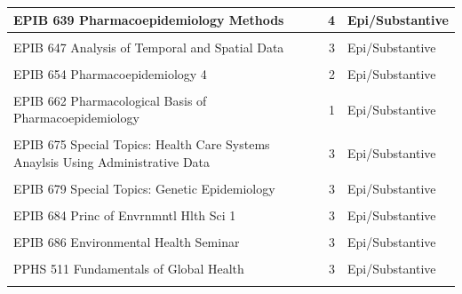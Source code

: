 \documentclass[
]{book}
\begin{document}
\begin{table}
{\begin{tabular}[t]{l|r|l}
\hline
EPIB 639 Pharmacoepidemiology Methods & 4 & Epi/Substantive\\
\hline
\cellcolor{gray!6}{EPIB 645 Confounding Control in Pharmacoepidemiology} & \cellcolor{gray!6}{1} & \cellcolor{gray!6}{Epi/Substantive}\\
\hline
EPIB 647 Analysis of Temporal and Spatial Data & 3 & Epi/Substantive\\
\hline
\cellcolor{gray!6}{EPIB 648 Methods in Social Epidemiology} & \cellcolor{gray!6}{3} & \cellcolor{gray!6}{Epi/Substantive}\\
\hline
EPIB 654 Pharmacoepidemiology 4 & 2 & Epi/Substantive\\
\hline
\cellcolor{gray!6}{EPIB 661 Pharmacoepidemiology 3} & \cellcolor{gray!6}{2} & \cellcolor{gray!6}{Epi/Substantive}\\
\hline
EPIB 662 Pharmacological Basis of Pharmacoepidemiology & 1 & Epi/Substantive\\
\hline
\cellcolor{gray!6}{EPIB 671 Cancer Epidemiology\&Prevention} & \cellcolor{gray!6}{2} & \cellcolor{gray!6}{Epi/Substantive}\\
\hline
EPIB 675 Special Topics: Health Care Systems Anaylsis Using Administrative Data & 3 & Epi/Substantive\\
\hline
\cellcolor{gray!6}{EPIB 676 Special Topics: Bayesian Analysis in the Health Sciences} & \cellcolor{gray!6}{3} & \cellcolor{gray!6}{Biostatistics}\\
\hline
EPIB 679 Special Topics: Genetic Epidemiology & 3 & Epi/Substantive\\
\hline
\cellcolor{gray!6}{EPIB 681 Global Health: Epid. Research} & \cellcolor{gray!6}{3} & \cellcolor{gray!6}{Epi/Substantive}\\
\hline
EPIB 684 Princ of Envrnmntl Hlth Sci 1 & 3 & Epi/Substantive\\
\hline
\cellcolor{gray!6}{EPIB 685 Princ of Envrnmntl Hlth Sci 2} & \cellcolor{gray!6}{3} & \cellcolor{gray!6}{Epi/Substantive}\\
\hline
EPIB 686 Environmental Health Seminar & 3 & Epi/Substantive\\
\hline
\cellcolor{gray!6}{PPHS 501 Population Health and Epidemiology} & \cellcolor{gray!6}{3} & \cellcolor{gray!6}{Epi/Substantive}\\
\hline
PPHS 511 Fundamentals of Global Health & 3 & Epi/Substantive\\
\hline
\cellcolor{gray!6}{PPHS 525 Healthcare Systems in Comparative Perspective} & \cellcolor{gray!6}{3} & \cellcolor{gray!6}{Epi/Substantive}\\

\end{tabular}}
\end{table}
\end{document}
